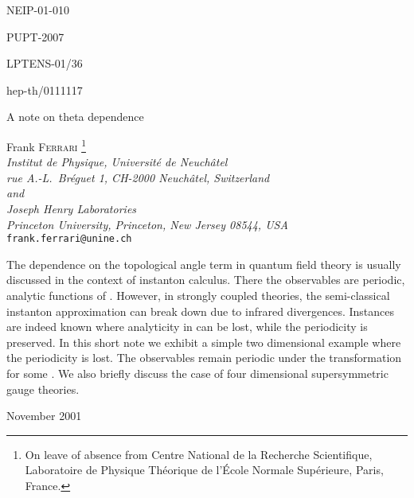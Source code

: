 \documentclass[a4paper,12pt]{article}
\begin{document}
%
%
\pagestyle{empty}
%
{\parskip 0in
\hfill NEIP-01-010

\hfill PUPT-2007

\hfill LPTENS-01/36

\hfill hep-th/0111117}

\vfill
%
\begin{center}
{\LARGE A note on theta dependence}

\vspace{0.4in}

Frank F{\scshape errari}{\renewcommand{\thefootnote}{\myHighlight{$\!\!\dagger$}\coordHE{}}
\footnote{On leave of absence from Centre 
National de la Recherche Scientifique, Laboratoire de Physique 
Th\'eorique de l'\'Ecole Normale Sup\'erieure, Paris, France.}}\\
\medskip
{\it Institut de Physique, Universit\'e de Neuch\^atel\\
rue A.-L.~Br\'eguet 1, CH-2000 Neuch\^atel, Switzerland\\
and\\
Joseph Henry Laboratories\\
Princeton University, Princeton, New Jersey 08544, USA}
\smallskip
{\tt frank.ferrari@unine.ch}
\end{center}

\vfill\noindent
The dependence on the topological \myHighlight{$\theta$}\coordHE{} angle term in quantum 
field theory is usually discussed in the context of instanton calculus. 
There the observables are \myHighlight{$2\pi$}\coordHE{} periodic, analytic functions of 
\myHighlight{$\theta$}\coordHE{}. However, in strongly coupled theories, the semi-classical 
instanton approximation can break down due to infrared 
divergences. Instances are indeed known where analyticity in \myHighlight{$\theta$}\coordHE{} 
can be lost, while the \myHighlight{$2\pi$}\coordHE{} periodicity is preserved.
In this short note we exhibit a simple two dimensional example where 
the \myHighlight{$2\pi$}\coordHE{} periodicity is lost. The observables remain periodic under 
the transformation \coordHE{} for some \coordHE{}. We 
also briefly discuss the case of four dimensional \coordHE{} 
supersymmetric gauge theories.
\vfill
\begin{flushleft}
November 2001
\end{flushleft}
\end{document}
